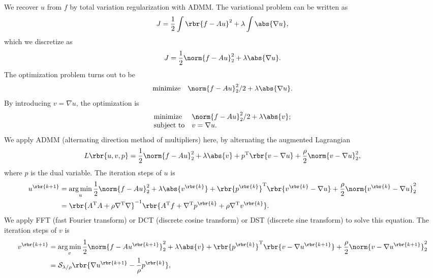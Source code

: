 \documentclass[english, nochinese]{pnote}
\begin{document}
We recover $u$ from $f$ by total variation regularization with ADMM. The variational problem can be written as
\begin{equation}
J = \frac{1}{2} \int \rbr{ f - A u }^2 + \lambda \int \abs{ \nabla u },
\end{equation}
which we discretize as
\begin{equation}
J = \frac{1}{2} \norm{ f - A u }_2^2 + \lambda \abs{ \nabla u }.
\end{equation}
The optimization problem turns out to be
\begin{equation}
\begin{array}{ll}
\text{minimize} & \norm{ f - A u }_2^2 / 2 + \lambda \abs{ \nabla u }.
\end{array}
\end{equation}
By introducing $ v = \nabla u $, the optimization is
\begin{equation}
\begin{array}{ll}
\text{minimize} & \norm{ f - A u }_2^2 / 2 + \lambda \abs{v}; \\
\text{subject to} & v = \nabla u.
\end{array}
\end{equation}
We apply ADMM (alternating direction method of multipliers) here, by alternating the augmented Lagrangian
\begin{equation}
L \rbr{ u, v, p } = \frac{1}{2} \norm{ f - A u }_2^2 + \lambda \abs{v} + p^{\text{T}} \rbr{ v - \nabla u } + \frac{\rho}{2} \norm{ v - \nabla u }_2^2,
\end{equation}
where $p$ is the dual variable. The iteration steps of $u$ is
\begin{equation} \label{Eq:ItU}
\begin{split}
u^{\rbr{ k + 1 }} &= \mathop{\arg\min}_u \frac{1}{2} \norm{ f - A u }_2^2 + \lambda \abs{v^{\rbr{k}}} + \rbr{p^{\rbr{k}}}^{\text{T}} \rbr{ v^{\rbr{k}} - \nabla u } + \frac{\rho}{2} \norm{ v^{\rbr{k}} - \nabla u }_2^2 \\
&= \rbr{ A^{\text{T}} A + \rho \nabla^{\text{T}} \nabla }^{-1} \rbr{ A^{\text{T}} f + \nabla^{\text{T}} p^{\rbr{k}} + \rho \nabla^{\text{T}} v^{\rbr{k}} }.
\end{split}
\end{equation}
We apply FFT (fast Fourier transform) or DCT (discrete cosine transform) or DST (discrete sine transform) to solve this equation. The iteration steps of $v$ is
\begin{equation}
\begin{split} \label{Eq:ItV}
v^{\rbr{ k + 1 }} &= \mathop{\arg\min}_v \frac{1}{2} \norm{ f - A u^{\rbr{ k + 1 }} }_2^2 + \lambda \abs{v} + \rbr{p^{\rbr{k}}}^{\text{T}} \rbr{ v - \nabla u^{\rbr{ k + 1 }} } + \frac{\rho}{2} \norm{ v - \nabla u^{\rbr{ k + 1 }} }_2^2 \\
&= \mathcal{S}_{ \lambda / \rho } \rbr{ \nabla u^{\rbr{ k + 1 }} - \frac{1}{\rho} p^{\rbr{k}} },
\end{split}
\end{equation}
\end{document}
